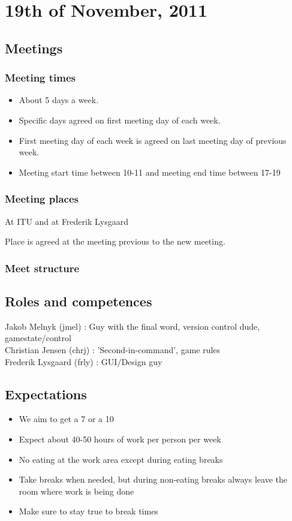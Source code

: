 \section{19th of November, 2011}
\subsection{Meetings}
\subsubsection{Meeting times}
\begin{itemize}
\item About 5 days a week.
\item Specific days agreed on first meeting day of each week.
\item First meeting day of each week is agreed on last meeting day of previous week.
\item Meeting start time between 10-11 and meeting end time between 17-19
\end{itemize}
\subsubsection{Meeting places}
At ITU and at Frederik Lysgaard

Place is agreed at the meeting previous to the new meeting.
\subsubsection{Meet structure}

\subsection{Roles and competences}
Jakob Melnyk (jmel) : Guy with the final word, version control dude, gamestate/control \\
Christian Jensen (chrj) : 'Second-in-command', game rules \\
Frederik Lysgaard (frly) : GUI/Design guy \\
\subsection{Expectations}
\begin{itemize}
\item We aim to get a 7 or a 10
\item Expect about 40-50 hours of work per person per week
\item No eating at the work area except during eating breaks
\item Take breaks when needed, but during non-eating breaks always leave the room where work is being done
\item Make sure to stay true to break times
\end{itemize}

